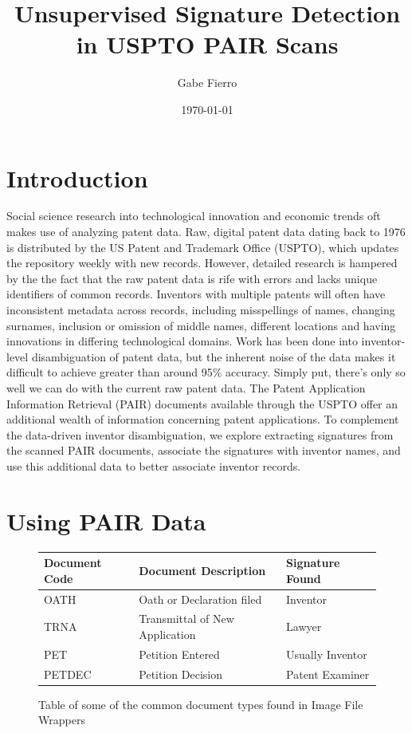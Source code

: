 \documentclass[12pt]{article}
\begin{document}
\title{Unsupervised Signature Detection in USPTO PAIR Scans}
\author{Gabe Fierro}
\date{\today}
\maketitle

\section{Introduction}

Social science research into technological innovation and economic trends oft makes use of analyzing patent data. Raw, digital patent data dating back to 1976 is distributed by the US Patent and Trademark Office (USPTO), which updates the repository weekly with new records. However, detailed research is hampered by the the fact that the raw patent data is rife with errors and lacks unique identifiers of common records. Inventors with multiple patents will often have inconsistent metadata across records, including misspellings of names, changing surnames, inclusion or omission of middle names, different locations and having innovations in differing technological domains. Work has been done into inventor-level disambiguation of patent data, but the inherent noise of the data makes it difficult to achieve greater than around 95\% accuracy. Simply put, there's only so well we can do with the current raw patent data.
The Patent Application Information Retrieval (PAIR) documents available through the USPTO offer an additional wealth of information concerning patent applications. To complement the data-driven inventor disambiguation, we explore extracting signatures from the scanned PAIR documents, associate the signatures with inventor names, and use this additional data to better associate inventor records. 

\section{Using PAIR Data}

\begin{figure}
\center
\begin{tabular}{| l | l | l |}
\hline
Document Code & Document Description & Signature Found \\
\hline
OATH & Oath or Declaration filed  & Inventor \\
TRNA & Transmittal of New Application & Lawyer \\
PET & Petition Entered & Usually Inventor \\ 
PETDEC & Petition Decision & Patent Examiner \\ 
\hline
\end{tabular}
\caption{Table of some of the common document types found in Image File Wrappers}
\label{fig:documenttypes}
\end{figure}
\end{document}
